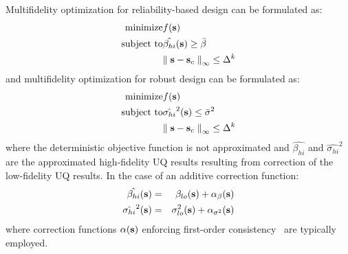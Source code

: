 Multifidelity optimization for reliability-based design can be
formulated as:
\begin{eqnarray}
  {\rm minimize }     & f({\bf s}) \nonumber \\
  {\rm subject \ to } & \hat{\beta_{hi}}({\bf s}) \ge \bar{\beta} \\
& {\parallel {\bf s} - {\bf s}_c \parallel}_\infty \le \Delta^k \nonumber
\label{eq:rbdo_mf}
\end{eqnarray}
and multifidelity optimization for robust design can be formulated as:
\begin{eqnarray}
  {\rm minimize }     & f({\bf s}) \nonumber \\
  {\rm subject \ to } & \hat{\sigma_{hi}}^2({\bf s}) \le \bar{\sigma}^2 \\
& {\parallel {\bf s} - {\bf s}_c \parallel}_\infty \le \Delta^k \nonumber
\label{eq:rdo_mf}
\end{eqnarray}
where the deterministic objective function is not approximated and 
$\hat{\beta_{hi}}$ and $\hat{\sigma_{hi}}^2$ are the approximated
high-fidelity UQ results resulting from correction of the low-fidelity 
UQ results.  In the case of an additive correction function:
\begin{eqnarray}
\hat{\beta_{hi}}({\bf s})    &=& \beta_{lo}({\bf s}) + 
\alpha_{\beta}({\bf s})  \label{eq:corr_lf_beta} \\
\hat{\sigma_{hi}}^2({\bf s}) &=& \sigma_{lo}^2({\bf s}) + 
\alpha_{\sigma^2}({\bf s}) \label{eq:corr_lf_sigma}
\end{eqnarray}
where correction functions $\alpha({\bf s})$ enforcing first-order
consistency~\cite{Eld04} are typically employed.
